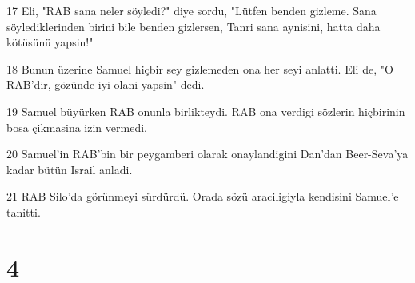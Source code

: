 \par 17 Eli, "RAB sana neler söyledi?" diye sordu, "Lütfen benden gizleme. Sana söylediklerinden birini bile benden gizlersen, Tanri sana aynisini, hatta daha kötüsünü yapsin!"
\par 18 Bunun üzerine Samuel hiçbir sey gizlemeden ona her seyi anlatti. Eli de, "O RAB'dir, gözünde iyi olani yapsin" dedi.
\par 19 Samuel büyürken RAB onunla birlikteydi. RAB ona verdigi sözlerin hiçbirinin bosa çikmasina izin vermedi.
\par 20 Samuel'in RAB'bin bir peygamberi olarak onaylandigini Dan'dan Beer-Seva'ya kadar bütün Israil anladi.
\par 21 RAB Silo'da görünmeyi sürdürdü. Orada sözü araciligiyla kendisini Samuel'e tanitti.

\chapter{4}


